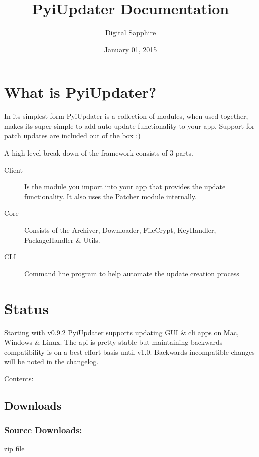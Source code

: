 \documentclass[letterpaper,10pt,english]{sphinxmanual}
\title{PyiUpdater Documentation}
\date{January 01, 2015}
\author{Digital Sapphire}
\begin{document}
\maketitle
\tableofcontents
{}\label{index::doc}



\chapter{What is PyiUpdater?}
\label{index:welcome-to-pyiupdater}\label{index:what-is-pyiupdater}
In its simplest form PyiUpdater is a collection of modules, when used together, makes its super simple to add auto-update functionality to your app. Support for patch updates are included out of the box :)

A high level break down of the framework consists of 3 parts.
\begin{description}
\item[{Client}] \leavevmode
Is the module you import into your app that provides the update functionality. It also uses the Patcher module internally.

\item[{Core}] \leavevmode
Consists of the Archiver, Downloader, FileCrypt, KeyHandler, PackageHandler \& Utils.

\item[{CLI}] \leavevmode
Command line program to help automate the update creation process

\end{description}


\chapter{Status}
\label{index:status}
Starting with v0.9.2 PyiUpdater supports updating GUI \& cli apps on Mac, Windows \& Linux. The api is pretty stable but maintaining backwards compatibility is on a best effort basis until v1.0. Backwards incompatible changes will be noted in the changelog.

Contents:


\section{Downloads}
\label{downloads:downloads}\label{downloads::doc}\label{downloads:id1}

\subsection{Source Downloads:}
\label{downloads:source-downloads}
\href{https://github.com/JohnyMoSwag/PyiUpdater/zipball/master}{zip file}
\end{document}

